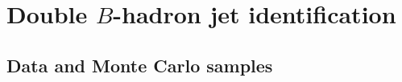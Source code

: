 %
%
\chapter{Double $B$-hadron jet identification}\label{ch:kinematic}








\section{Data and Monte Carlo samples}\label{sec:Simulation}


